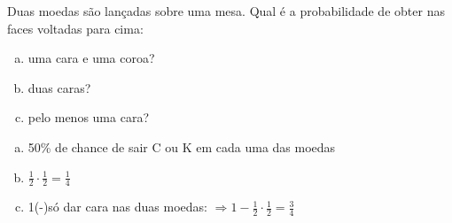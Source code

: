 \begin{ex}
Duas moedas são lançadas sobre uma mesa. Qual é a probabilidade de obter nas faces voltadas para cima:
   \begin{enumerate}[(a)]
   \item uma cara e uma coroa?
   \item duas caras?
   \item pelo menos uma cara?
   \end{enumerate}
    \begin{sol}
     \phantom{A}
      \begin{enumerate}[(a)]
          \item 50\% de chance de sair C ou K em cada uma das moedas
          \item $\frac{1}{2}\cdot\frac{1}{2}=\frac{1}{4} $
          \item 1\hspace{0,3cm}(-)\hspace{0,3cm}só dar cara nas duas moedas: $\Longrightarrow 1-\frac{1}{2}\cdot\frac{1}{2}=\frac{3}{4}$
          \end{enumerate}
    \end{sol}
\end{ex}